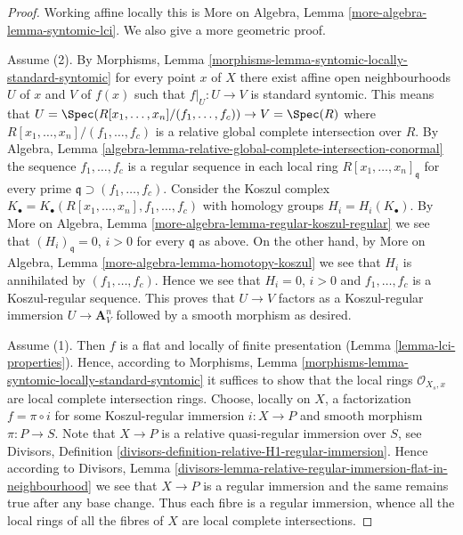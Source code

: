 \begin{proof}
Working affine locally this is
More on Algebra, Lemma \ref{more-algebra-lemma-syntomic-lci}.
We also give a more geometric proof.

\medskip\noindent
Assume (2). By
Morphisms, Lemma \ref{morphisms-lemma-syntomic-locally-standard-syntomic}
for every point $x$ of $X$ there exist affine open neighbourhoods
$U$ of $x$ and $V$ of $f(x)$ such that $f|_U : U \to V$ is standard syntomic.
This means that $U = \Spec(R[x_1, \ldots, x_n]/(f_1, \ldots, f_c))
\to V = \Spec(R)$ where $R[x_1, \ldots, x_n]/(f_1, \ldots, f_c)$ is a
relative global complete intersection over $R$. By
Algebra,
Lemma \ref{algebra-lemma-relative-global-complete-intersection-conormal}
the sequence $f_1, \ldots, f_c$ is a regular sequence in each local
ring $R[x_1, \ldots, x_n]_{\mathfrak q}$ for every prime
$\mathfrak q \supset (f_1, \ldots, f_c)$. Consider the Koszul complex
$K_\bullet = K_\bullet(R[x_1, \ldots, x_n], f_1, \ldots, f_c)$
with homology groups $H_i = H_i(K_\bullet)$. By
More on Algebra, Lemma \ref{more-algebra-lemma-regular-koszul-regular}
we see that $(H_i)_{\mathfrak q} = 0$, $i > 0$ for every $\mathfrak q$
as above. On the other hand, by
More on Algebra, Lemma \ref{more-algebra-lemma-homotopy-koszul}
we see that $H_i$ is annihilated by $(f_1, \ldots, f_c)$. Hence we
see that $H_i = 0$, $i > 0$ and $f_1, \ldots, f_c$ is a Koszul-regular
sequence. This proves that $U \to V$ factors as a Koszul-regular
immersion $U \to \mathbf{A}^n_V$ followed by a smooth morphism as desired.

\medskip\noindent
Assume (1). Then $f$ is a flat and locally of finite presentation
(Lemma \ref{lemma-lci-properties}).
Hence, according to
Morphisms, Lemma \ref{morphisms-lemma-syntomic-locally-standard-syntomic}
it suffices to show that the local rings $\mathcal{O}_{X_s, x}$
are local complete intersection rings. Choose, locally on $X$, a factorization
$f = \pi \circ i$ for some Koszul-regular immersion $i : X \to P$
and smooth morphism $\pi : P \to S$. Note that $X \to P$ is
a relative quasi-regular immersion over $S$, see
Divisors, Definition \ref{divisors-definition-relative-H1-regular-immersion}.
Hence according to
Divisors,
Lemma \ref{divisors-lemma-relative-regular-immersion-flat-in-neighbourhood}
we see that $X \to P$ is a regular immersion and the same remains true
after any base change. Thus each fibre is a regular immersion, whence
all the local rings of all the fibres of $X$ are local complete intersections.
\end{proof}

